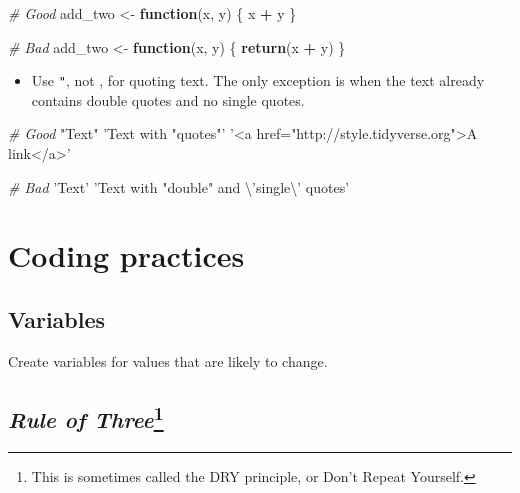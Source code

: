 \documentclass[]{book}
\newenvironment{Shaded}{\begin{snugshade}}{\end{snugshade}}
\newcommand{\KeywordTok}[1]{\textcolor[rgb]{0.13,0.29,0.53}{\textbf{#1}}}
\newcommand{\CharTok}[1]{\textcolor[rgb]{0.31,0.60,0.02}{#1}}
\newcommand{\StringTok}[1]{\textcolor[rgb]{0.31,0.60,0.02}{#1}}
\newcommand{\CommentTok}[1]{\textcolor[rgb]{0.56,0.35,0.01}{\textit{#1}}}
\newcommand{\ControlFlowTok}[1]{\textcolor[rgb]{0.13,0.29,0.53}{\textbf{#1}}}
\newcommand{\OperatorTok}[1]{\textcolor[rgb]{0.81,0.36,0.00}{\textbf{#1}}}
\newcommand{\NormalTok}[1]{#1}
\providecommand{\tightlist}{%
  \setlength{\itemsep}{0pt}\setlength{\parskip}{0pt}}
\let\rmarkdownfootnote\footnote%
\def\footnote{\protect\rmarkdownfootnote}
\begin{document}
\begin{Shaded}
\begin{Highlighting}[]
\CommentTok{# Good}
\NormalTok{add_two <-}\StringTok{ }\ControlFlowTok{function}\NormalTok{(x, y) \{}
\NormalTok{  x }\OperatorTok{+}\StringTok{ }\NormalTok{y}
\NormalTok{\}}

\CommentTok{# Bad}
\NormalTok{add_two <-}\StringTok{ }\ControlFlowTok{function}\NormalTok{(x, y) \{}
  \KeywordTok{return}\NormalTok{(x }\OperatorTok{+}\StringTok{ }\NormalTok{y)}
\NormalTok{\}}
\end{Highlighting}
\end{Shaded}

\begin{itemize}
\tightlist
\item
  Use \texttt{"}, not \texttt{\textquotesingle{}}, for quoting text. The
  only exception is when the text already contains double quotes and no
  single quotes.
\end{itemize}

\begin{Shaded}
\begin{Highlighting}[]
\CommentTok{# Good}
\StringTok{"Text"}
\StringTok{'Text with "quotes"'}
\StringTok{'<a href="http://style.tidyverse.org">A link</a>'}

\CommentTok{# Bad}
\StringTok{'Text'}
\StringTok{'Text with "double" and }\CharTok{\textbackslash{}'}\StringTok{single}\CharTok{\textbackslash{}'}\StringTok{ quotes'}
\end{Highlighting}
\end{Shaded}

\section{Coding practices}\label{coding-practices}

\subsection{Variables}\label{variables}

Create variables for values that are likely to change.

\subsection[\emph{Rule of Three}]{\texorpdfstring{\emph{Rule of
Three}\footnote{This is sometimes called the DRY principle, or Don't
  Repeat Yourself.}}{Rule of Three}}\label{rule-of-threedry}
\end{document}
